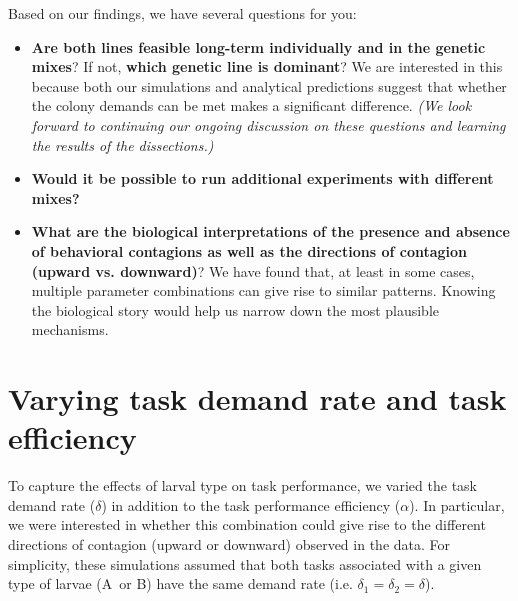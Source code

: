 \documentclass[11pt]{article}
\newcommand{\A}{{\color{red}A}}
\newcommand{\B}{{\color{blue}B}}
\begin{document}
\noindent Based on our findings, we have several questions for you:
\begin{itemize}
    \item \textbf{Are both lines feasible long-term individually and in the genetic mixes}? If not, \textbf{which genetic line is dominant}? 
    We are interested in this because both our simulations and analytical predictions suggest that whether the colony demands can be met makes a significant difference. \textit{\small (We look forward to continuing our ongoing discussion on these questions and learning the results of the dissections.)}
    
    \item \textbf{Would it be possible to run additional experiments with different mixes?} 
    
    \item \textbf{What are the biological interpretations of the presence and absence of behavioral contagions as well as the directions of contagion (upward vs. downward)}? We have found that, at least in some cases, multiple parameter combinations can give rise to similar patterns. Knowing the biological story would help us narrow down the most plausible mechanisms.
\end{itemize}

\newpage
\section{Varying task demand rate and task efficiency} \label{sec:varyalphadelta}

To capture the effects of larval type on task performance, we varied the task demand rate ($\delta$) in addition to the task performance efficiency ($\alpha$). In particular, we were interested in whether this combination could give rise to the different directions of contagion (upward or downward) observed in the data. 
For simplicity, these simulations assumed that both tasks associated with a given type of larvae (\A\ or \B) have the same demand rate (i.e. $\delta_1=\delta_2=\delta$).
\end{document}
